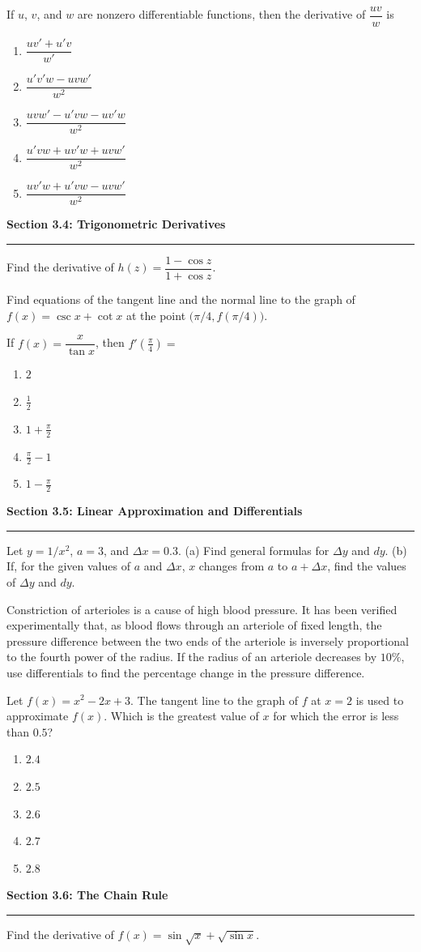 \documentclass[11pt]{article}
\newcommand{\wsM}{\vspace*{3.1cm}}
\newcommand{\wsL}{\vspace*{5.0cm}}
\newcommand{\prob}[1]{\item[\textbf{#1}]}
\newcommand{\choices}[5]{\begin{enumerate}[label=\textbf{(\Alph*)},leftmargin=2.4em,itemsep=1pt,topsep=4pt]\item #1\item #2\item #3\item #4\item #5\end{enumerate}}
\newcommand{\topicdivider}[2]{%
  \Needspace{11.5cm}%
  \par\medskip
  \noindent\textbf{Section #1: #2}\par
  \vspace{0.25em}
  \noindent\rule{\linewidth}{0.6pt}\par
  \medskip
}
\begin{document}
\Needspace{7cm}
\begin{probs}
\prob{24.} If $u$, $v$, and $w$ are nonzero differentiable functions, then the derivative of $\dfrac{uv}{w}$ is\choices{$\dfrac{uv'+u'v}{w'}$}{$\dfrac{u'v'w-uvw'}{w^2}$}{$\dfrac{uvw'-u'vw-uv'w}{w^2}$}{$\dfrac{u'vw+uv'w+uvw'}{w^2}$}{$\dfrac{uv'w+u'vw-uvw'}{w^2}$} \wsM
\end{probs}
\topicdivider{3.4}{Trigonometric Derivatives}
\Needspace{7cm}
\begin{probs}
\prob{25.} Find the derivative of $h(z)=\dfrac{1-\cos z}{1+\cos z}$. \wsM
\end{probs}
\Needspace{7cm}
\begin{probs}
\prob{26.} Find equations of the tangent line and the normal line to the graph of $f(x)=\csc x+\cot x$ at the point $\bigl(\pi/4,f(\pi/4)\bigr)$. \wsM
\end{probs}
\Needspace{7cm}
\begin{probs}
\prob{27.} If $f(x)=\dfrac{x}{\tan x}$, then $f'(\frac\pi4)=$\choices{$2$}{$\frac12$}{$1+\frac\pi2$}{$\frac\pi2-1$}{$1-\frac\pi2$} \wsM
\end{probs}
\topicdivider{3.5}{Linear Approximation and Differentials}
\Needspace{10cm}
\begin{probs}
\prob{28.} Let $y=1/x^2$, $a=3$, and $\Delta x=0.3$. (a) Find general formulas for $\Delta y$ and $dy$. (b) If, for the given values of $a$ and $\Delta x$, $x$ changes from $a$ to $a+\Delta x$, find the values of $\Delta y$ and $dy$. \wsL
\end{probs}
\Needspace{10cm}
\begin{probs}
\prob{29.} Constriction of arterioles is a cause of high blood pressure. It has been verified experimentally that, as blood flows through an arteriole of fixed length, the pressure difference between the two ends of the arteriole is inversely proportional to the fourth power of the radius. If the radius of an arteriole decreases by $10\%$, use differentials to find the percentage change in the pressure difference. \wsL
\end{probs}
\Needspace{7cm}
\begin{probs}
\prob{30.} Let $f(x)=x^2-2x+3$. The tangent line to the graph of $f$ at $x=2$ is used to approximate $f(x)$. Which is the greatest value of $x$ for which the error is less than $0.5$?\choices{$2.4$}{$2.5$}{$2.6$}{$2.7$}{$2.8$} \wsM
\end{probs}
\topicdivider{3.6}{The Chain Rule}
\Needspace{7cm}
\begin{probs}
\prob{31.} Find the derivative of $f(x)=\sin\sqrt{x}+\sqrt{\sin x}$. \wsM
\end{probs}
\end{document}

